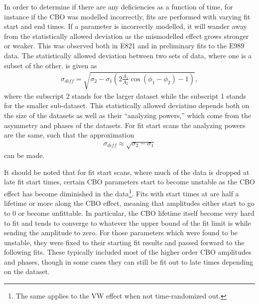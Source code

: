 In order to determine if there are any deficiencies as a function of time, for instance if the CBO was modelled incorrectly, fits are performed with varying fit start and end times. If a parameter is incorrectly modelled, it will wander away from the statistically allowed deviation as the mismodelled effect grows stronger or weaker. This was observed both in E821 and in preliminary fits to the E989 data. The statistically allowed deviation between two sets of data, where one is a subset of the other, is given as \cite{E821FinalReport}
  \begin{align} \label{eq:sigmaDiffFull}
    \sigma_{diff} = \sqrt{\sigma_{2} - \sigma_{1}(2 \frac{A_{1}}{A_{2}}\cos(\phi_{1}-\phi_{2}) - 1)},
  \end{align}
where the subscript 2 stands for the larger dataset while the subscript 1 stands for the smaller sub-dataset. This statistically allowed deviatino depends both on the size of the datasets as well as their ``analyzing powers,'' which come from the asymmetry and phases of the datasets. For fit start scans the analyzing powers are the same, such that the approximation 
  \begin{align} \label{eq:sigmaDiffApprox}
    \sigma_{diff} \approx \sqrt{\sigma_{2} - \sigma_{1}}
  \end{align}
can be made. 


It should be noted that for fit start scans, where much of the data is dropped at late fit start times, certain CBO parameters start to become unstable as the CBO effect has become diminished in the data\footnote{The same applies to the VW effect when not time-randomized out.}. Fits with start times at  are half a lifetime or more along the CBO effect, meaning that amplitudes either start to go to 0 or become unfittable. In particular, the CBO lifetime itself become very hard to fit and tends to converge to whatever the upper bound of the fit limit is while sending the amplitude to zero. For those parameters which were found to be unstable, they were fixed to their starting fit results and passed forward to the following fits. These typically included most of the higher order CBO amplitudes and phases, though in some cases they can still be fit out to late times depending on the dataset.


